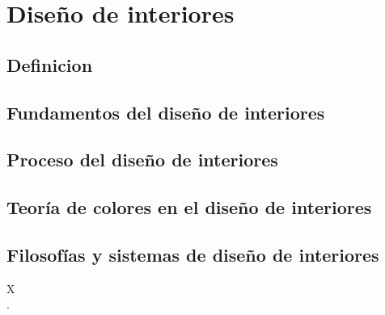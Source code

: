 \section{Diseño de interiores}
\subsection{Definicion}
\subsection{Fundamentos del diseño de interiores}

\subsection{Proceso del diseño de interiores}

\subsection{Teoría de colores en el diseño de interiores}
\subsection{Filosofías y sistemas de diseño de interiores}
X\\.\par 

